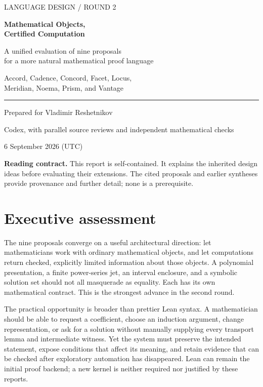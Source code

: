 \documentclass[11pt,letterpaper]{article}
\begin{document}
\hypersetup{pageanchor=false}
\begin{titlepage}
\color{ink}
{\sffamily\large LANGUAGE DESIGN / ROUND 2\par}
\vspace{1.15in}
{\sffamily\bfseries\fontsize{31}{36}\selectfont Mathematical Objects,\\Certified Computation\par}
\vspace{.35in}
{\sffamily\Large A unified evaluation of nine proposals\\for a more natural mathematical proof language\par}
\vspace{.5in}
{\large Accord, Cadence, Concord, Facet, Locus,\\Meridian, Noema, Prism, and Vantage\par}
\vfill
\rule{\textwidth}{1pt}
Prepared for Vladimir Reshetnikov\par
Codex, with parallel source reviews and independent mathematical checks\par
6 September 2026 (UTC)\par
\vspace{.3in}
\textbf{Reading contract.} This report is self-contained. It explains the inherited
design ideas before evaluating their extensions. The cited proposals and earlier
syntheses provide provenance and further detail; none is a prerequisite.
\end{titlepage}
\hypersetup{pageanchor=true}

\section*{Executive assessment}
The nine proposals converge on a useful architectural direction: let mathematicians
work with ordinary mathematical objects, and let computations return checked,
explicitly limited information about those objects. A polynomial presentation, a
finite power-series jet, an interval enclosure, and a symbolic solution set should
not all masquerade as equality. Each has its own mathematical contract. This is
the strongest advance in the second round.

The practical opportunity is broader than prettier Lean syntax. A mathematician
should be able to request a coefficient, choose an induction argument, change
representation, or ask for a solution without manually supplying every transport
lemma and intermediate witness. Yet the system must preserve the intended
statement, expose conditions that affect its meaning, and retain evidence that
can be checked after exploratory automation has disappeared. Lean can remain the
initial proof backend; a new kernel is neither required nor justified by these
reports.
\end{document}
